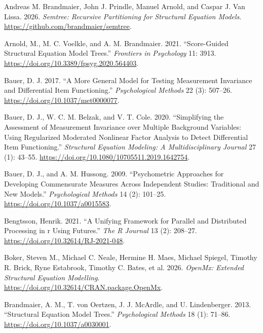 \documentclass[
  man,
  floatsintext]{apa7}
\newlength{\cslhangindent}
\newenvironment{CSLReferences}[2] %
 {\begin{list}{}{%
  \setlength{\itemindent}{0pt}
  \setlength{\leftmargin}{0pt}
  \setlength{\parsep}{0pt}
  \ifodd #1
   \setlength{\leftmargin}{\cslhangindent}
   \setlength{\itemindent}{-1\cslhangindent}
  \fi
  \setlength{\itemsep}{#2\baselineskip}}}
 {\end{list}}
\begin{document}
\label{refs}
\begin{CSLReferences}{1}{0}
Andreas M. Brandmaier, John J. Prindle, Manuel Arnold, and Caspar J. Van
Lissa. 2026. \emph{Semtree: Recursive Partitioning for Structural
Equation Models}. \url{https://github.com/brandmaier/semtree}.

Arnold, M., M. C. Voelkle, and A. M. Brandmaier. 2021. {``Score-Guided
Structural Equation Model Trees.''} \emph{Frontiers in Psychology} 11:
3913. \url{https://doi.org/10.3389/fpsyg.2020.564403}.

Bauer, D. J. 2017. {``A More General Model for Testing Measurement
Invariance and Differential Item Functioning.''} \emph{Psychological
Methods} 22 (3): 507--26. \url{https://doi.org/10.1037/met0000077}.

Bauer, D. J., W. C. M. Belzak, and V. T. Cole. 2020. {``Simplifying the
Assessment of Measurement Invariance over Multiple Background Variables:
Using Regularized Moderated Nonlinear Factor Analysis to Detect
Differential Item Functioning.''} \emph{Structural Equation Modeling: A
Multidisciplinary Journal} 27 (1): 43--55.
\url{https://doi.org/10.1080/10705511.2019.1642754}.

Bauer, D. J., and A. M. Hussong. 2009. {``Psychometric Approaches for
Developing Commensurate Measures Across Independent Studies: Traditional
and New Models.''} \emph{Psychological Methods} 14 (2): 101--25.
\url{https://doi.org/10.1037/a0015583}.

Bengtsson, Henrik. 2021. {``A Unifying Framework for Parallel and
Distributed Processing in r Using Futures.''} \emph{The R Journal} 13
(2): 208--27. \url{https://doi.org/10.32614/RJ-2021-048}.

Boker, Steven M., Michael C. Neale, Hermine H. Maes, Michael Spiegel,
Timothy R. Brick, Ryne Estabrook, Timothy C. Bates, et al. 2026.
\emph{OpenMx: Extended Structural Equation Modelling}.
\url{https://doi.org/10.32614/CRAN.package.OpenMx}.

Brandmaier, A. M., T. von Oertzen, J. J. McArdle, and U. Lindenberger.
2013. {``Structural Equation Model Trees.''} \emph{Psychological
Methods} 18 (1): 71--86. \url{https://doi.org/10.1037/a0030001}.


\end{CSLReferences}
\end{document}

